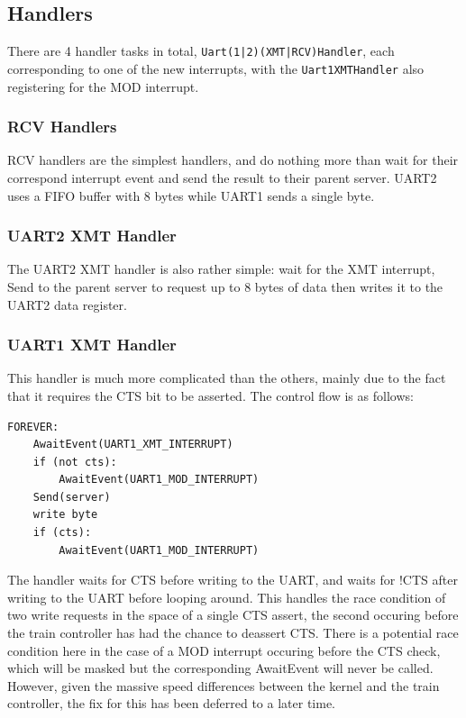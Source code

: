 \documentclass[12pt]{article}
\begin{document}
\subsection{Handlers}
There are 4 handler tasks in total, \texttt{Uart(1|2)(XMT|RCV)Handler}, each corresponding to one of the new interrupts, with the
\texttt{Uart1XMTHandler} also registering for the MOD interrupt.

\subsubsection{RCV Handlers}
RCV handlers are the simplest handlers, and do nothing more than wait for their correspond interrupt event and send the
result to their parent server. UART2 uses a FIFO buffer with 8 bytes while UART1 sends a single byte.

\subsubsection{UART2 XMT Handler}
The UART2 XMT handler is also rather simple: wait for the XMT interrupt, Send to the parent server to request up to 8
bytes of data then writes it to the UART2 data register.

\subsubsection{UART1 XMT Handler}
This handler is much more complicated than the others, mainly due to the fact that it requires the CTS bit to be
asserted. The control flow is as follows:
\begin{verbatim}
FOREVER:
    AwaitEvent(UART1_XMT_INTERRUPT)
    if (not cts):
        AwaitEvent(UART1_MOD_INTERRUPT)
    Send(server)
    write byte
    if (cts):
        AwaitEvent(UART1_MOD_INTERRUPT)
\end{verbatim}
The handler waits for CTS before writing to the UART, and waits for !CTS after writing to the UART before looping
around. This handles the race condition of two write requests in the space of a single CTS assert, the second occuring 
before the train controller has had the chance to deassert CTS. There is a potential race condition here in the case of
a MOD interrupt occuring before the CTS check, which will be masked but the corresponding AwaitEvent will never be
called. However, given the massive speed differences between the kernel and the train controller, the fix for this has
been deferred to a later time.
\end{document}
